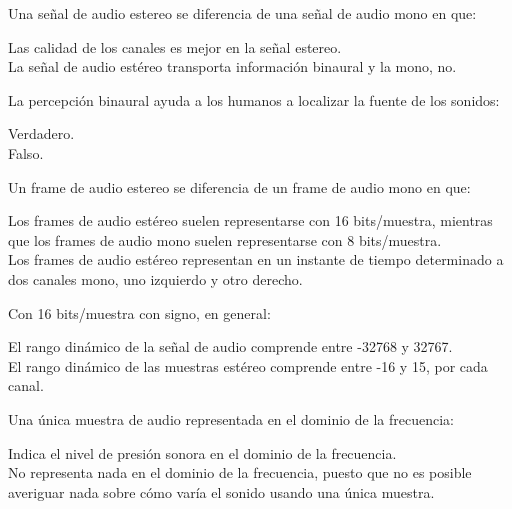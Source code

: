 \documentclass[legalpaper, 12pt, addpoints]{exam}
\begin{document}
\begin{questions}
\vspace{0.10in}

\question Una señal de audio estereo se diferencia de una señal de audio mono en que:

\begin{oneparchoices}
  \choice Las calidad de los canales es mejor en la señal estereo.\\
  \choice La señal de audio estéreo transporta información binaural y la mono, no.
\end{oneparchoices}
  
\vspace{0.10in}

\question La percepción binaural ayuda a los humanos a localizar la fuente de los sonidos:

\begin{oneparchoices}
  \choice Verdadero.\\
  \choice Falso.
\end{oneparchoices}
  
\vspace{0.10in}

\question Un frame de audio estereo se diferencia de un frame de audio mono en que:

\begin{oneparchoices}
  \choice Los frames de audio estéreo suelen representarse con 16
  bits/muestra,
  mientras que los frames de audio mono suelen representarse con 8 bits/muestra.\\
  \choice Los frames de audio estéreo representan en un instante de
  tiempo determinado a dos canales mono, uno izquierdo y otro derecho.
\end{oneparchoices}
  
\vspace{0.10in}

\question Con 16 bits/muestra con signo, en general:

\begin{oneparchoices}
  \choice El rango dinámico de la señal de audio comprende entre -32768 y 32767.\\
  \choice El rango dinámico de las muestras estéreo comprende entre -16 y 15, por cada canal.
\end{oneparchoices}
  
\vspace{0.10in}

\question Una única muestra de audio representada en el dominio de la frecuencia:

\begin{oneparchoices}
  \choice Indica el nivel de presión sonora en el dominio de la frecuencia.\\
  \choice No representa nada en el dominio de la frecuencia, puesto
  que no es posible averiguar nada sobre cómo varía el sonido usando
  una única muestra.
\end{oneparchoices}
  

\end{questions}
\end{document}
